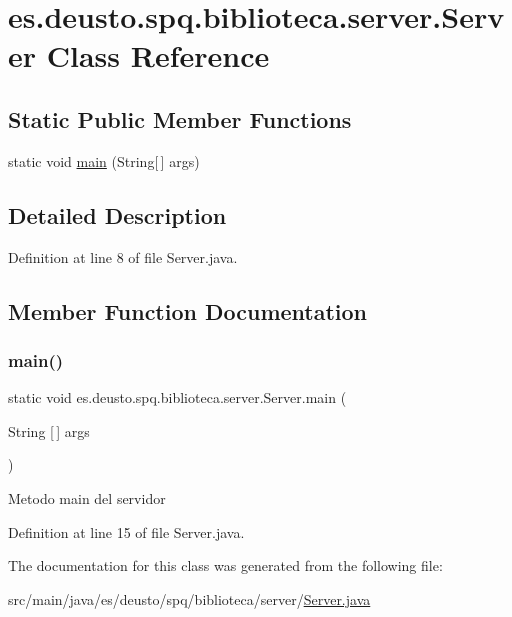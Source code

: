 \hypertarget{classes_1_1deusto_1_1spq_1_1biblioteca_1_1server_1_1_server}{}\section{es.\+deusto.\+spq.\+biblioteca.\+server.\+Server Class Reference}
\label{classes_1_1deusto_1_1spq_1_1biblioteca_1_1server_1_1_server}
\subsection*{Static Public Member Functions}
\begin{DoxyCompactItemize}
\item 
static void \mbox{\hyperlink{classes_1_1deusto_1_1spq_1_1biblioteca_1_1server_1_1_server_a0a075fe4c8da81d4dfefcb20a840e619}{main}} (String\mbox{[}$\,$\mbox{]} args)
\end{DoxyCompactItemize}


\subsection{Detailed Description}


Definition at line 8 of file Server.\+java.



\subsection{Member Function Documentation}
\mbox{\label{classes_1_1deusto_1_1spq_1_1biblioteca_1_1server_1_1_server_a0a075fe4c8da81d4dfefcb20a840e619}} 
\subsubsection{\texorpdfstring{main()}{main()}}
{\footnotesize\ttfamily static void es.\+deusto.\+spq.\+biblioteca.\+server.\+Server.\+main (\begin{DoxyParamCaption}\item[{String \mbox{[}$\,$\mbox{]}}]{args }\end{DoxyParamCaption})\hspace{0.3cm}{\ttfamily [static]}}

Metodo main del servidor 

Definition at line 15 of file Server.\+java.



The documentation for this class was generated from the following file\+:\begin{DoxyCompactItemize}
\item 
src/main/java/es/deusto/spq/biblioteca/server/\mbox{\hyperlink{_server_8java}{Server.\+java}}\end{DoxyCompactItemize}
